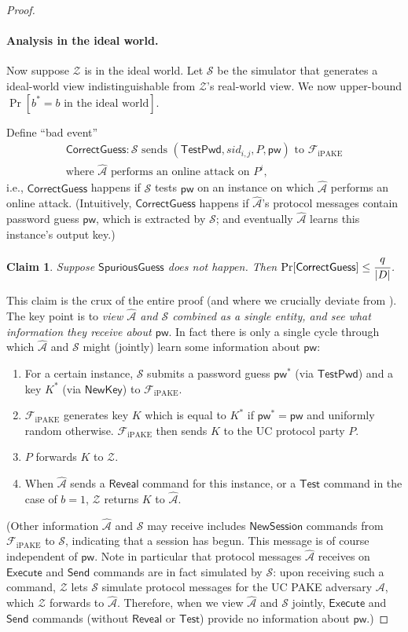 \documentclass{article}
\newtheorem{claim}{Claim}
\newcommand{\adv}{\mathcal{A}}
\newcommand{\env}{\mathcal{Z}}
\renewcommand{\sim}{\mathcal{S}}
\newcommand{\func}{\mathcal{F}}
\newcommand{\Fipake}{\func_\mathrm{iPAKE}}
\newcommand{\pw}{\mathsf{pw}}
\newcommand{\NewSession}{\mathsf{NewSession}}
\newcommand{\TestPwd}{\mathsf{TestPwd}}
\newcommand{\NewKey}{\mathsf{NewKey}}
\newcommand{\Execute}{\mathsf{Execute}}
\newcommand{\Send}{\mathsf{Send}}
\newcommand{\Reveal}{\mathsf{Reveal}}
\newcommand{\Test}{\mathsf{Test}}
\newcommand{\SpuriousGuess}{\mathsf{SpuriousGuess}}
\newcommand{\CorrectGuess}{\mathsf{CorrectGuess}}
\begin{document}
\begin{proof}
\paragraph{Analysis in the ideal world.}
Now suppose $\env$ is in the ideal world. Let $\sim$ be the simulator that generates a ideal-world view indistinguishable from $\env$'s real-world view. We now upper-bound $\Pr[b^* = b\text{ in the ideal world}]$.

Define ``bad event''
\begin{align*}
\CorrectGuess : \sim\text{ sends }(\TestPwd, sid_{i,j}, P, \pw)\text{ to }\Fipake \\
\text{where }\widehat{\adv}\text{ performs an online attack on }P^i,
\end{align*}
i.e., $\CorrectGuess$ happens if $\sim$ tests $\pw$ on an instance on which $\widehat{\adv}$ performs an online attack. (Intuitively, $\CorrectGuess$ happens if $\widehat{\adv}$'s protocol messages contain password guess $\pw$, which is extracted by $\sim$; and eventually $\widehat{\adv}$ learns this instance's output key.)
\begin{claim}
\label{clm:tested}
Suppose $\SpuriousGuess$ does not happen. Then $\Pr[\CorrectGuess] \leq \cfrac{q}{|D|}$.
\end{claim}
This claim is the crux of the entire proof (and where we crucially deviate from \cite{EC:CHKLM05}). The key point is to \emph{view $\widehat{\adv}$ and $\sim$ combined as a single entity, and see what information they receive about $\pw$}. In fact there is only a single cycle through which $\widehat{\adv}$ and $\sim$ might (jointly) learn some information about $\pw$:
\begin{enumerate}
  \item For a certain instance, $\sim$ submits a password guess $\pw^*$ (via $\TestPwd$) and a key $K^*$ (via $\NewKey$) to $\Fipake$.
  \item $\Fipake$ generates key $K$ which is equal to $K^*$ if $\pw^* = \pw$ and uniformly random otherwise. $\Fipake$ then sends $K$ to the UC protocol party $P$.
  \item $P$ forwards $K$ to $\env$.
  \item When $\widehat{\adv}$ sends a $\Reveal$ command for this instance, or a $\Test$ command in the case of $b = 1$, $\env$ returns $K$ to $\widehat{\adv}$.
\end{enumerate}
(Other information $\widehat{\adv}$ and $\sim$ may receive includes $\NewSession$ commands from $\Fipake$ to $\sim$, indicating that a session has begun. This message is of course independent of $\pw$. Note in particular that protocol messages $\widehat{\adv}$ receives on $\Execute$ and $\Send$ commands are in fact simulated by $\sim$: upon receiving such a command, $\env$ lets $\sim$ simulate protocol messages for the UC PAKE adversary $\adv$, which $\env$ forwards to $\widehat{\adv}$. Therefore, {\color{blue}when we view $\widehat{\adv}$ and $\sim$ jointly, $\Execute$ and $\Send$ commands (without $\Reveal$ or $\Test$) provide no information about $\pw$}.)


\end{proof}
\end{document}
